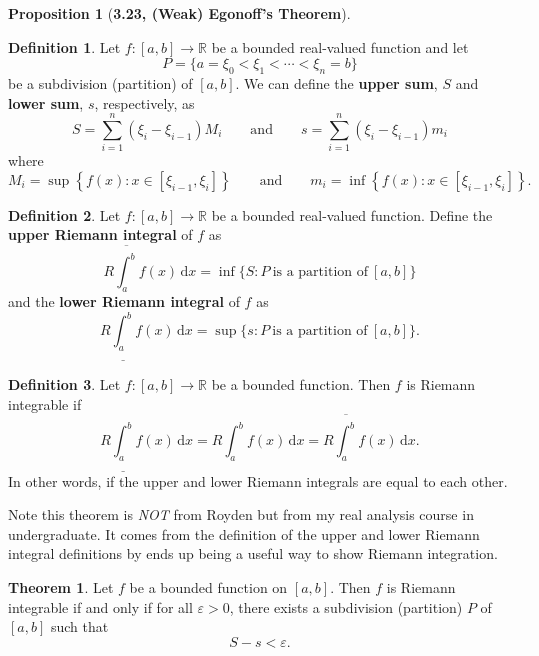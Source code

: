 \documentclass[12pt]{article}
\newcommand{\R}{\mathbb{R}}
\renewcommand{\epsilon}{\varepsilon}
\newcommand{\upint}[2]{
  \overline{\int_{#1}^{#2}}
}
\newcommand{\lowint}[2]{
  \underline{\int_{#1}^{#2}}
}
\theoremstyle{definition}
\newtheorem*{thm}{Theorem}
\newtheorem*{definition}{Definition}
\newtheorem*{prop}{Proposition}
\begin{document}
\begin{prop}[\textbf{3.23, (Weak) Egonoff's Theorem}]
        \begin{definition}
            Let \( f:[a,b] \to \R \) be a bounded real-valued function and let
                \[
                    P = \{ a = \xi_{0} < \xi_{1} < \cdots < \xi_n = b \}
                \]
            be a subdivision (partition) of \( [a, b] \). We can define the \textbf{upper sum}, \( S \) and \textbf{lower sum}, \( s \), respectively, as
                \[
                    S = \sum_{i=1}^{n} (\xi_i - \xi_{i-1})M_i \qquad \text{and} \qquad  s = \sum_{i=1}^{n} (\xi_i - \xi_{i-1})m_i
                \]
            where
                \[
                    M_i = \sup \left\{ f(x): x \in [\xi_{i-1}, \xi_{i} ] \right\} \qquad \text{and} \qquad  m_i = \inf \left\{ f(x): x \in [\xi_{i-1}, \xi_i ]\right\}.
                \]
        \end{definition}
    
\end{prop}

\begin{definition}
    Let \( f: [a , b] \to \R \) be a bounded real-valued function. Define the \textbf{upper Riemann integral} of \( f \) as
        \[
            R \upint{a}{b} f(x) \, \mathrm{d} x = \inf \{ S: P \ \text{is a partition of} \ [a,b] \}
        \]
    and the \textbf{lower Riemann integral} of \( f \) as
        \[
            R \lowint{a}{b} f(x) \, \mathrm{d} x = \sup \{ s: P \ \text{is a partition of} \ [a,b] \}.
        \]
\end{definition}

\begin{definition}
    Let \( f: [a , b] \to \R \) be a bounded function. Then \( f \) is Riemann integrable if 
        \[
            R \lowint{a}{b} f(x) \, \mathrm{d} x = R \int_{a}^{b} f(x) \, \mathrm{d}x = R \upint{a}{b} f(x) \, \mathrm{d} x.
        \]
    In other words, if the upper and lower Riemann integrals are equal to each other. 
\end{definition}

Note this theorem is \emph{NOT} from Royden but from my real analysis course in undergraduate. It comes from the definition of the upper and lower Riemann integral definitions by ends up being a useful way to show Riemann integration. 

\begin{thm}

    Let \( f \) be a bounded function on \( [a,b] \). Then \( f \) is Riemann integrable if and only if for all \( \epsilon > 0 \), there exists a subdivision (partition) \( P \) of \( [a,b] \) such that 
        \[
            S  - s < \epsilon.    
        \]

\end{thm}
\end{document}
